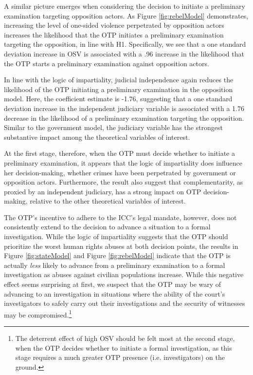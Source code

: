 A similar picture emerges when considering the decision to initiate a preliminary examination targeting opposition actors. As Figure \ref{fig:rebelModel} demonstrates, increasing the level of one-sided violence perpetrated by opposition actors increases the likelihood that the OTP initiates a preliminary examination targeting the opposition, in line with H1. Specifically, we see that a one standard deviation increase in OSV is associated with a .96 increase in the likelihood that the OTP starts a preliminary examination against opposition actors.

In line with the logic of impartiality, judicial independence again reduces the likelihood of the OTP initiating a preliminary examination in the opposition model.  Here, the coefficient estimate is -1.76, suggesting that a one standard deviation increase in the independent judiciary variable is associated with a 1.76 decrease in the likelihood of a preliminary examination targeting the opposition. Similar to the government model, the judiciary variable has the strongest substantive impact among the theoretical variables of interest.

At the first stage, therefore, when the OTP must decide whether to initiate a preliminary examination, it appears that the logic of impartiality does influence her decision-making, whether crimes have been perpetrated by government or opposition actors. Furthermore, the result also suggest that complementarity, as proxied by an independent judiciary, has a strong impact on OTP decision-making, relative to the other theoretical variables of interest.

The OTP's incentive to adhere to the ICC's legal mandate, however, does not consistently extend to the decision to advance a situation to a formal investigation. While the logic of impartiality suggests that the OTP should prioritize the worst human rights abuses at both decision points, the results in Figure \ref{fig:stateModel} and Figure \ref{fig:rebelModel} indicate that the OTP is actually \textit{less} likely to advance from a preliminary examination to a formal investigation as abuses against civilian populations increase. While this negative effect seems surprising at first, we suspect that the OTP may be wary of advancing to an investigation in situations where the ability of the court's investigators to safely carry out their investigations and the security of witnesses may be compromised.\footnote{The deterrent effect of high OSV should be felt most at the second stage, when the OTP decides whether to initiate a formal investigation, as this stage requires a much greater OTP presence (i.e. investigators) on the ground.}

